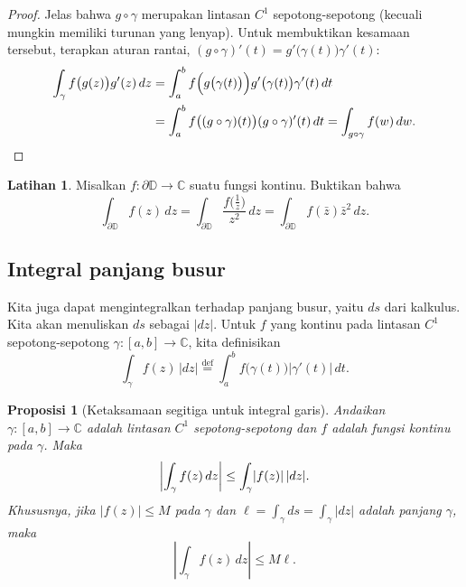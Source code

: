 \documentclass[12pt,openany]{book}
\newcommand{\avoidbreak}{\postdisplaypenalty=100}
\newcommand{\sabs}[1]{\lvert {#1} \rvert}
\newcommand{\abs}[1]{\left\lvert {#1} \right\rvert}
\newcommand{\C}{{\mathbb{C}}}
\newcommand{\D}{{\mathbb{D}}}
\theoremstyle{plain}
\newtheorem{prop}[thm]{Proposisi}
\theoremstyle{remark}
\theoremstyle{definition}
\newenvironment{exbox}{%
    \def\FrameCommand{\vrule width 1pt \relax\hspace{10pt}}%
    \MakeFramed{\advance\hsize-\width\FrameRestore}%
}{%
    \endMakeFramed
}
\theoremstyle{exercise}
\newtheorem{exercise}{Latihan}[section]
\theoremstyle{example}
\begin{document}
\begin{proof}
Jelas bahwa $g \circ \gamma$ merupakan lintasan $C^1$ sepotong-sepotong (kecuali mungkin
memiliki turunan yang lenyap).  Untuk membuktikan kesamaan tersebut,
terapkan aturan rantai,
$(g \circ \gamma)'(t) = g'\bigl(\gamma(t)\bigr) \gamma'(t)$:
\begin{equation*}
\begin{split}
\int_{\gamma} f\bigl(g(z)\bigr) g'(z) \, dz
& =
\int_a^b
f\Bigl(g\bigl(\gamma(t)\bigr)\Bigr) g'\bigl(\gamma(t)\bigr) \gamma'(t) \, dt
\\
& =
\int_a^b
f\bigl((g \circ \gamma)(t)\bigr) (g \circ \gamma)'(t) \, dt
=
\int_{g \circ \gamma} f(w) \, dw . \qedhere
\end{split}
\end{equation*}
\end{proof}

\begin{exbox}
\begin{exercise}
Misalkan $f \colon \partial \D \to \C$ suatu fungsi kontinu.  Buktikan bahwa
\begin{equation*}
\int_{\partial \D} f(z) \, dz
=
\int_{\partial \D} \frac{f\bigl(\frac{1}{z}\bigr)}{z^2} \, dz
=
\int_{\partial \D} f(\bar{z}) \bar{z}^2 \, dz .
\end{equation*}
\end{exercise}
\end{exbox}

\subsection{Integral panjang busur}

Kita juga dapat mengintegralkan terhadap panjang busur, yaitu $ds$ dari kalkulus.
Kita akan menuliskan $ds$ sebagai $\sabs{dz}$.  Untuk $f$ yang kontinu pada
lintasan $C^1$ sepotong-sepotong $\gamma \colon [a,b] \to \C$,
kita definisikan
\begin{equation*}
\int_\gamma f(z) \, \sabs{dz}
\overset{\text{def}}{=}
\int_a^b f\bigl( \gamma(t) \bigr) \sabs{\gamma'(t)} \, dt .
\end{equation*}


\begin{prop}[Ketaksamaan segitiga untuk integral garis]%
Andaikan $\gamma \colon [a,b] \to \C$ adalah
lintasan $C^1$ sepotong-sepotong dan $f$ adalah fungsi kontinu pada
$\gamma$.  Maka
\begin{equation*}
\abs{\int_\gamma f(z) \, dz} \leq \int_\gamma \sabs{f(z)} \, \sabs{dz} .
\avoidbreak
\end{equation*}
Khususnya, jika $\sabs{f(z)} \leq M$ pada $\gamma$ dan $\ell = \int_\gamma ds
= \int_{\gamma} \sabs{dz}$ adalah panjang $\gamma$, maka
\begin{equation*}
\abs{\int_\gamma f(z) \, dz} \leq M \ell .
\end{equation*}
\end{prop} 
\end{document}
